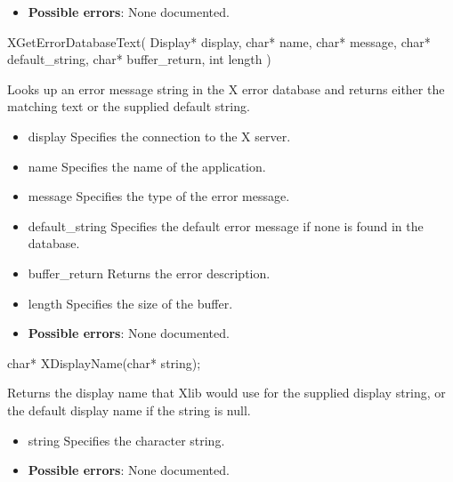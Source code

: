 \documentclass{report}
\begin{document}
\begin{itemize}
        \begin{itemize}
            \item \textbf{Possible errors}: None documented.
        \end{itemize}

        \begin{cppcode}
            XGetErrorDatabaseText(
                Display* display,
                char* name,
                char* message,
                char* default_string,
                char* buffer_return,
                int length
            )
        \end{cppcode}
        \bigbreak \noindent
        Looks up an error message string in the X error database and returns either the matching text or the supplied default string.

        \begin{itemize}
            \item display Specifies the connection to the X server.
            \item name Specifies the name of the application.
            \item message Specifies the type of the error message.
            \item default\_string Specifies the default error message if none is found in the database.
            \item buffer\_return Returns the error description.
            \item length Specifies the size of the buffer.
        \end{itemize}

        \begin{itemize}
            \item \textbf{Possible errors}: None documented.
        \end{itemize}

        \begin{cppcode}
            char* XDisplayName(char* string);
        \end{cppcode}
        \bigbreak \noindent
        Returns the display name that Xlib would use for the supplied display string, or the default display name if the string is null.

        \begin{itemize}
            \item string Specifies the character string.
        \end{itemize}

        \begin{itemize}
            \item \textbf{Possible errors}: None documented.
        \end{itemize}


\end{itemize}
\end{document}
